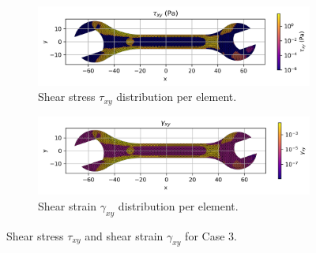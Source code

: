 \begin{figure}[H]
    \centering
    \begin{subfigure}[t]{0.49\textwidth}
        \centering
        \includegraphics[width=\textwidth]{GRAFICOS/Case c - tau_xy_per_element.png}
        \caption{Shear stress $\tau_{xy}$ distribution per element.}
        \label{fig:tau_xy_c}
    \end{subfigure}
    \hfill
    \begin{subfigure}[t]{0.49\textwidth}
        \centering
        \includegraphics[width=\textwidth]{GRAFICOS/Case c - gamma_xy_per_element.png}
        \caption{Shear strain $\gamma_{xy}$ distribution per element.}
        \label{fig:gamma_xy_c}
    \end{subfigure}
    \caption{Shear stress $\tau_{xy}$ and shear strain $\gamma_{xy}$ for Case 3.}
    \label{fig:shear_fields_c}
\end{figure}

